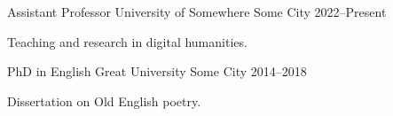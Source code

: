 \documentclass[11pt, a4paper]{awesome-cv}
\begin{document}
\makecvheader

\cventry
  {Assistant Professor}
  {University of Somewhere}
  {Some City}
  {2022--Present}
  {
    \begin{cvitems}
      \item {Teaching and research in digital humanities.}
    \end{cvitems}
  }

\cventry
  {PhD in English}
  {Great University}
  {Some City}
  {2014--2018}
  {
    \begin{cvitems}
      \item {Dissertation on Old English poetry.}
    \end{cvitems}
  }
\end{document}
